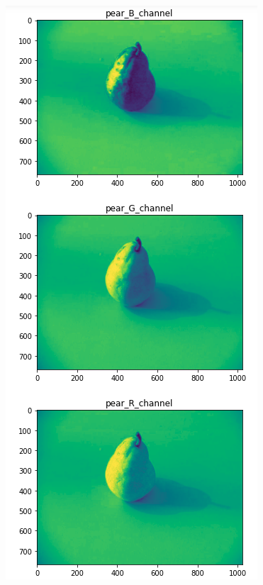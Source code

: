 \documentclass{article}
\begin{document}
\begin{multicols}{2}
\centering
{}
\includegraphics[scale=0.3]{../screenshots/RGB_2.png}


\end{multicols}
\end{document}
